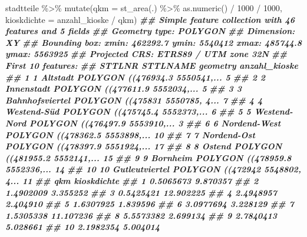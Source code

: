 \documentclass[11pt,german,a4paper]{article}
\newenvironment{Shaded}{\begin{snugshade}}{\end{snugshade}}
\newcommand{\AttributeTok}[1]{\textcolor[rgb]{0.77,0.63,0.00}{#1}}
\newcommand{\DecValTok}[1]{\textcolor[rgb]{0.00,0.00,0.81}{#1}}
\newcommand{\DocumentationTok}[1]{\textcolor[rgb]{0.56,0.35,0.01}{\textbf{\textit{#1}}}}
\newcommand{\FunctionTok}[1]{\textcolor[rgb]{0.00,0.00,0.00}{#1}}
\newcommand{\NormalTok}[1]{#1}
\newcommand{\SpecialCharTok}[1]{\textcolor[rgb]{0.00,0.00,0.00}{#1}}
\begin{document}
\begin{Shaded}
\begin{Highlighting}[]
\NormalTok{stadtteile }\SpecialCharTok{\%\textgreater{}\%}
  \FunctionTok{mutate}\NormalTok{(}\AttributeTok{qkm =} \FunctionTok{st\_area}\NormalTok{(.) }\SpecialCharTok{\%\textgreater{}\%} \FunctionTok{as.numeric}\NormalTok{() }\SpecialCharTok{/} \DecValTok{1000} \SpecialCharTok{/} \DecValTok{1000}\NormalTok{,}
         \AttributeTok{kioskdichte =}\NormalTok{ anzahl\_kioske }\SpecialCharTok{/}\NormalTok{ qkm)}
\DocumentationTok{\#\# Simple feature collection with 46 features and 5 fields}
\DocumentationTok{\#\# Geometry type: POLYGON}
\DocumentationTok{\#\# Dimension:     XY}
\DocumentationTok{\#\# Bounding box:  xmin: 462292.7 ymin: 5540412 xmax: 485744.8 ymax: 5563925}
\DocumentationTok{\#\# Projected CRS: ETRS89 / UTM zone 32N}
\DocumentationTok{\#\# First 10 features:}
\DocumentationTok{\#\#    STTLNR        STTLNAME                       geometry anzahl\_kioske}
\DocumentationTok{\#\# 1       1        Altstadt POLYGON ((476934.3 5550541,...             5}
\DocumentationTok{\#\# 2       2      Innenstadt POLYGON ((477611.9 5552034,...             5}
\DocumentationTok{\#\# 3       3 Bahnhofsviertel POLYGON ((475831 5550785, 4...             7}
\DocumentationTok{\#\# 4       4     Westend{-}Süd POLYGON ((475745.4 5552373,...             6}
\DocumentationTok{\#\# 5       5    Westend{-}Nord POLYGON ((476497.9 5553910,...             3}
\DocumentationTok{\#\# 6       6    Nordend{-}West POLYGON ((478362.5 5553898,...            10}
\DocumentationTok{\#\# 7       7     Nordend{-}Ost POLYGON ((478397.9 5551924,...            17}
\DocumentationTok{\#\# 8       8          Ostend POLYGON ((481955.2 5552141,...            15}
\DocumentationTok{\#\# 9       9        Bornheim POLYGON ((478959.8 5552336,...            14}
\DocumentationTok{\#\# 10     10  Gutleutviertel POLYGON ((472942 5548802, 4...            11}
\DocumentationTok{\#\#          qkm kioskdichte}
\DocumentationTok{\#\# 1  0.5065673    9.870357}
\DocumentationTok{\#\# 2  1.4902009    3.355252}
\DocumentationTok{\#\# 3  0.5425421   12.902225}
\DocumentationTok{\#\# 4  2.4948957    2.404910}
\DocumentationTok{\#\# 5  1.6307925    1.839596}
\DocumentationTok{\#\# 6  3.0977694    3.228129}
\DocumentationTok{\#\# 7  1.5305338   11.107236}
\DocumentationTok{\#\# 8  5.5573382    2.699134}
\DocumentationTok{\#\# 9  2.7840413    5.028661}
\DocumentationTok{\#\# 10 2.1982354    5.004014}
\end{Highlighting}
\end{Shaded}
\end{document}
